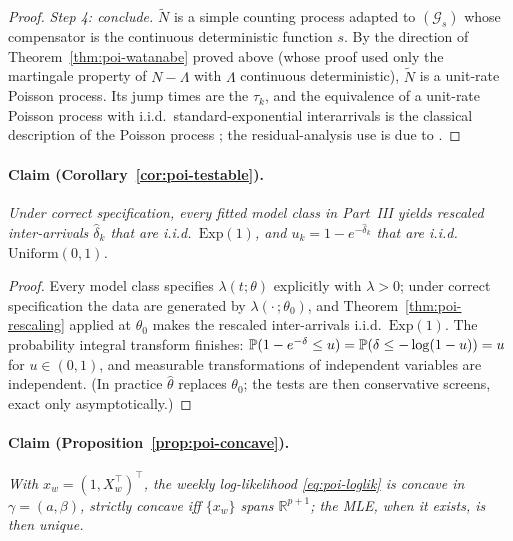 \begin{proof}
\emph{Step 4: conclude.} $\tilde N$ is a simple counting process adapted to $(\mathcal{G}_s)$ whose
compensator is the continuous deterministic function $s$. By the direction of
Theorem~\ref{thm:poi-watanabe} proved above (whose proof used only the martingale property of $N -
\Lambda$ with $\Lambda$ continuous deterministic), $\tilde N$ is a unit-rate Poisson process. Its
jump times are the $\tau_k$, and the equivalence of a unit-rate Poisson process with i.i.d.\
standard-exponential interarrivals is the classical description of the Poisson process
\cite[Ch.~2]{daley2003}; the residual-analysis use is due to \cite{ogata1988}.
\end{proof}

\paragraph{Claim (Corollary~\ref{cor:poi-testable}).}
\emph{Under correct specification, every fitted model class in Part~III yields rescaled
inter-arrivals $\hat\delta_k$ that are i.i.d.\ $\mathrm{Exp}(1)$, and $u_k = 1 - e^{-\hat\delta_k}$
that are i.i.d.\ $\mathrm{Uniform}(0,1)$.}

\begin{proof}
Every model class specifies $\lambda(t; \theta)$ explicitly with $\lambda > 0$; under correct
specification the data are generated by $\lambda(\cdot\,; \theta_0)$, and
Theorem~\ref{thm:poi-rescaling} applied at $\theta_0$ makes the rescaled inter-arrivals i.i.d.\
$\mathrm{Exp}(1)$. The probability integral transform finishes: $\mathbb{P}(1 - e^{-\delta} \le u) =
\mathbb{P}(\delta \le -\log(1-u)) = u$ for $u \in (0,1)$, and measurable transformations of independent
variables are independent. (In practice $\hat\theta$ replaces $\theta_0$; the tests are then
conservative screens, exact only asymptotically.)
\end{proof}

\paragraph{Claim (Proposition~\ref{prop:poi-concave}).}
\emph{With $x_w = (1, X_w^\top)^\top$, the weekly log-likelihood \eqref{eq:poi-loglik} is concave in
$\gamma = (a, \beta)$, strictly concave iff $\{x_w\}$ spans $\mathbb{R}^{p+1}$; the MLE, when it
exists, is then unique.}

